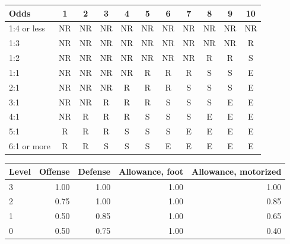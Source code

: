 \documentclass[11pt]{article}
\begin{document}
\par\medskip\noindent\begin{minipage}{\textwidth}
\centering\small
\begin{tabular}{@{}l*{10}{c}@{}}
\toprule
Odds & 1 & 2 & 3 & 4 & 5 & 6 & 7 & 8 & 9 & 10 \\
\midrule
1:4 or less & NR & NR & NR & NR & NR & NR & NR & NR & NR & NR \\
1:3 & NR & NR & NR & NR & NR & NR & NR & NR & NR & R \\
1:2 & NR & NR & NR & NR & NR & NR & NR & R & R & S \\
1:1 & NR & NR & NR & NR & R & R & R & S & S & E \\
2:1 & NR & NR & NR & R & R & R & S & S & S & E \\
3:1 & NR & NR & R & R & R & S & S & S & E & E \\
4:1 & NR & R & R & R & S & S & S & E & E & E \\
5:1 & R & R & R & S & S & S & E & E & E & E \\
6:1 or more & R & R & S & S & S & E & E & E & E & E \\
\bottomrule
\end{tabular}
\label{tab:crt}
\end{minipage}

\par\medskip\noindent\begin{minipage}{\textwidth}
\centering\small
\begin{tabular}{@{}lrrrr@{}}
\toprule
Level & Offense & Defense & Allowance, foot & Allowance, motorized \\
\midrule
3 & 1.00 & 1.00 & 1.00 & 1.00 \\
2 & 0.75 & 1.00 & 1.00 & 0.85 \\
1 & 0.50 & 0.85 & 1.00 & 0.65 \\
0 & 0.50 & 0.75 & 1.00 & 0.40 \\
\bottomrule
\end{tabular}
\label{tab:supply}
\end{minipage}
\end{document}
